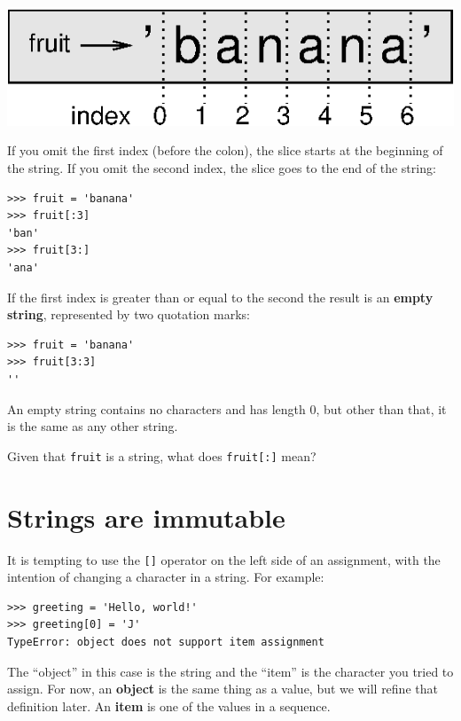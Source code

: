 \documentclass[10pt]{book}
\begin{document}
\beforefig
\centerline{\includegraphics{figs/banana.eps}}
\afterfig

If you omit the first index (before the colon), the slice starts at
the beginning of the string.  If you omit the second index, the slice
goes to the end of the string:

\beforeverb
\begin{verbatim}
>>> fruit = 'banana'
>>> fruit[:3]
'ban'
>>> fruit[3:]
'ana'
\end{verbatim}
\afterverb
%
If the first index is greater than or equal to the second the result
is an {\bf empty string}, represented by two quotation marks:


\beforeverb
\begin{verbatim}
>>> fruit = 'banana'
>>> fruit[3:3]
''
\end{verbatim}
\afterverb
%
An empty string contains no characters and has length 0, but other
than that, it is the same as any other string.

\begin{ex}
Given that {\tt fruit} is a string, what does
{\tt fruit[:]} mean?



\end{ex}


\section{Strings are immutable}

It is tempting to use the {\tt []} operator on the left side of an
assignment, with the intention of changing a character in a string.
For example:


\beforeverb
\begin{verbatim}
>>> greeting = 'Hello, world!'
>>> greeting[0] = 'J'
TypeError: object does not support item assignment
\end{verbatim}
\afterverb
%
The ``object'' in this case is the string and the ``item'' is
the character you tried to assign.  For now, an {\bf object} is
the same thing as a value, but we will refine that definition
later.  An {\bf item} is one of the values in a sequence.
\end{document}
